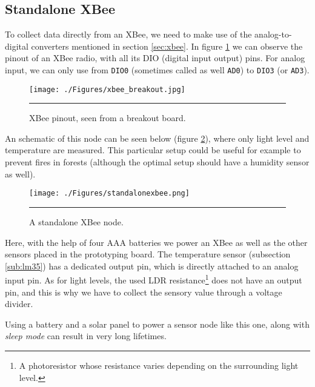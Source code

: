 \subsection{Standalone XBee}

To collect data directly from an XBee\textregistered{}, we need to make use of the analog-to-digital converters mentioned in section \ref{sec:xbee}. In figure \ref{fig:XBeeBO} we can observe the pinout of an XBee radio, with all its DIO (digital input output) pins. For analog input, we can only use from \texttt{DIO0} (sometimes called as well \texttt{AD0}) to \texttt{DIO3} (or \texttt{AD3})\citep{faludi2010building}.

\begin{figure}[htbp]
    \centering
        \texttt{[image: ./Figures/xbee\_breakout.jpg]}
        \rule{35em}{0.5pt}
    \caption[XBee pinout]{XBee pinout, seen from a breakout board.}
    \label{fig:XBeeBO}
\end{figure}

An schematic of this node can be seen below (figure \ref{fig:StandaloneXBee}), where only light level and temperature are measured. This particular setup could be useful for example to prevent fires in forests (although the optimal setup should have a humidity sensor as well).

\begin{figure}[htbp]
    \centering
        \texttt{[image: ./Figures/standalonexbee.png]}
        \rule{35em}{0.5pt}
    \caption[Standalone XBee]{A standalone XBee node.}
    \label{fig:StandaloneXBee}
\end{figure}

Here, with the help of four AAA batteries we power an XBee\textregistered{} as well as the other sensors placed in the prototyping board. The temperature sensor (subsection \ref{sub:lm35}) has a dedicated output pin, which is directly attached to an analog input pin. As for light levels, the used LDR resistance\footnote{A photoresistor whose resistance varies depending on the surrounding light level.} does not have an output pin, and this is why we have to collect the sensory value through a voltage divider.

Using a battery and a solar panel to power a sensor node like this one, along with \emph{sleep mode} can result in very long lifetimes.

